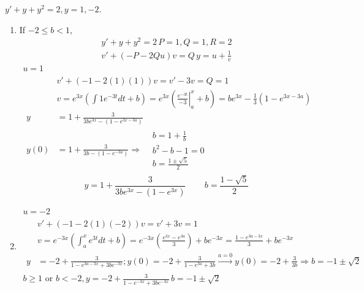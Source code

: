 \documentclass[twoside]{amsart}
\theoremstyle{plain}
\theoremstyle{definition}
\newcommand{\exercisehead}[1]
  {\smallskip
   \noindent{\small\bf Exercise #1.}}
\begin{document}
\exercisehead{20} $y'+ y + y^2 =2, y =1,-2$.  
\begin{enumerate}
\item If $-2 \leq b < 1 $, 
\[
\begin{gathered}
  y'+y+y^2 = 2 \, P =1, Q =1, R=2 \\
  v' + (-P-2Qu) v  = Q \, y = u + \frac{1}{v}  
\end{gathered}
\]
\[
\begin{gathered}
  u=1 \\ 
  \begin{aligned} 
    &    v' + (-1-2(1)(1))v = v' -3v = Q =1 \\
    & v = e^{3x} \left( \int 1 e^{-3t} dt + b \right)  = e^{3x} \left( \left. \frac{ e^{-3t}}{ -3} \right|_a^x  + b \right) = b e^{3x} - \frac{1}{3} \left( 1 - e^{3x - 3a} \right)  \\
    y & = 1 + \frac{ 3 }{ 3be^{3x} - (1-e^{3x-3a})} \\
    y(0) & = 1 + \frac{ 3}{ 3b -(1-e^{-3a} ) } \Longrightarrow \begin{aligned} & b = 1 + \frac{1}{b} \\ & b^2 - b-1 = 0 \\ & b = \frac{ 1 \pm \sqrt{5}}{ 2 } \end{aligned} 
  \end{aligned}
\end{gathered}
\]
\[  
\boxed{ y  = 1 + \frac{3}{ 3be^{3x} - (1-e^{3x} ) } \quad \quad \, b = \frac{1- \sqrt{5}}{2} }
  \]
\item 
\[
\begin{gathered}
u =-2 \\
\begin{aligned}
  & v' + (-1-2(1)(-2))v = v' +3v = 1 \\
  & v =e^{-3x} \left( \int_a^x e^{3t} dt + b \right) = e^{-3x} \left( \frac{ e^{3x} - e^{3a} }{ 3} \right) + be^{-3x} = \frac{ 1 - e^{3a-3x}}{3} + be^{-3x} \\
  y & = -2 + \frac{3}{ 1 - e^{3a - 3x} + 3be^{-3x} }; y(0) = -2 + \frac{ 3 }{ 1 -e^{3a} +3b } \xrightarrow{a=0} y(0) = -2 + \frac{3}{3b} \Longrightarrow b = -1 \pm \sqrt{2} 
\end{aligned} \\
\boxed{ b \geq 1 \text{ or } b < -2 , y = -2 + \frac{ 3 }{ 1-e^{-3x} + 3b e^{-3x} }\, b = -1 \pm \sqrt{2} }
\end{gathered}
\]
\end{enumerate} 

\end{document}
